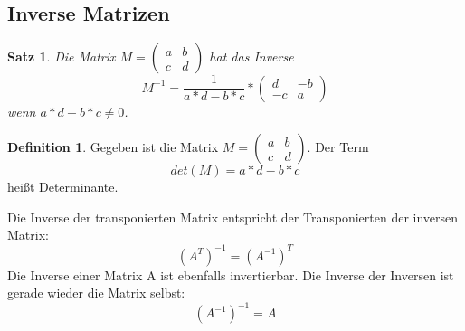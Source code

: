 \documentclass[a4paper,10pt,DIV9, BCOR12mm, oneside,openright,openbib]{scrreprt}
\theoremstyle{definition}
\newtheorem{mydef}{Definition}[section]
\theoremstyle{plain}
\newtheorem{mysat}{Satz}[section]
\begin{document}
\subsection{Inverse Matrizen}
\begin{mysat} \label{Inverse Matrix} 
Die Matrix $ M=\begin{pmatrix} a & b \\ c & d \end{pmatrix} $ hat das Inverse \[ M^{-1}= \dfrac{1}{a*d-b*c}*\begin{pmatrix} d & -b \\ -c & a \end{pmatrix} \] wenn $a*d-b*c \neq 0$.
\end{mysat}
\begin{mydef} \label{Determinante} 
Gegeben ist die Matrix $ M=\begin{pmatrix} a & b \\ c & d \end{pmatrix} $. Der Term \[det(M)=a*d-b*c\] heißt Determinante. \\[5ex]
\end{mydef}
Die Inverse der transponierten Matrix entspricht der Transponierten der inversen Matrix:
    \[\left(A^T\right)^{-1} = \left(A^{-1}\right)^T\]
Die Inverse einer Matrix A ist ebenfalls invertierbar. Die Inverse der Inversen ist gerade wieder die Matrix selbst:
    \[\left(A^{-1}\right)^{-1} = A\]
  
\end{document}
